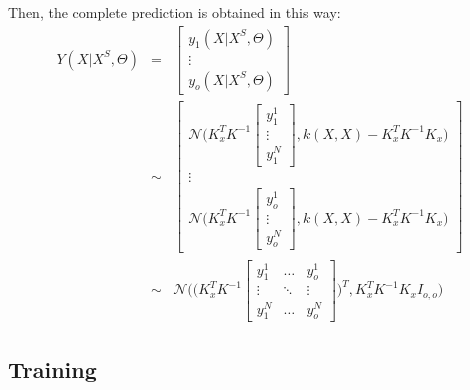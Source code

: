 \documentclass{article}
\begin{document}
Then, the complete prediction is obtained in this way:
\begin{eqnarray}
Y(X | X^S, \Theta) &=&
\begin{bmatrix} y_1(X | X^S, \Theta) \\ \vdots \\ y_o(X | X^S, \Theta) \end{bmatrix} \\
&\sim&
\begin{bmatrix}
\mathcal{N} \bigg (  
K_x^T K^{-1} \begin{bmatrix} y_1^1 \\ \vdots \\ y_1^N \end{bmatrix} 
, k(X,X) - K_x^T K^{-1}K_x 
\bigg )
\\
\vdots
\\
\mathcal{N} \bigg (  
K_x^T K^{-1} \begin{bmatrix} y_o^1 \\ \vdots \\ y_o^N \end{bmatrix} 
, k(X,X) - K_x^T K^{-1}K_x 
\bigg )
\end{bmatrix}  \\
&\sim&
\mathcal{N} \bigg ( 
\bigg (
K_x^T K^{-1}
\begin{bmatrix}
y_1^1 & \hdots & y_o^1 \\
\vdots & \ddots & \vdots \\
y_1^N & \hdots & y_o^N
\end{bmatrix}
\bigg )^T
 ,K_x^T K^{-1}K_x 
I_{o,o}
\bigg )
\end{eqnarray}


\subsection{Training}
\end{document}
